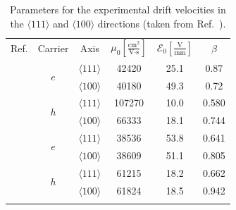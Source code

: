 \documentclass[epj,referee]{svjour}
\begin{document}
\begin{table}[htpb]
\centering
\caption{Parameters for the experimental drift velocities in the
$\langle111\rangle$ and $\langle 100 \rangle$ directions
(taken from Ref.~\cite{bart}).}
\label{t:pars}
\begin{tabular}{cccccc}
\hline\noalign{\smallskip}
Ref. & Carrier & Axis &
$\mu_{0} \left[\frac{\mbox{cm}^{2}}{\mbox{V}\cdot\mbox{s}}\right]$ &
$\mathcal{E}_{0}\left[\frac{\mbox{V}}{\mbox{mm}}\right]$ & $\beta$\\
\noalign{\smallskip}\hline\noalign{\smallskip}

\multirow{2}{*}{\cite{miha}}&\multirow{2}{*}{$e$} &
$\langle111\rangle$ & 42420 & 25.1 & 0.87 \\
& & $\langle100\rangle$ & 40180 & 49.3 & 0.72 \\
\noalign{\smallskip}\hline\noalign{\smallskip}

\multirow{2}{*}{\cite{reg}}&\multirow{2}{*}{$h$} &
$\langle111\rangle$ & 107270 & 10.0 & 0.580 \\
& & $\langle100\rangle$ & 66333 & 18.1 & 0.744 \\
\noalign{\smallskip}\hline\noalign{\smallskip}

\multirow{4}{*}{\cite{bart}}&\multirow{2}{*}{$e$} &
$\langle111\rangle$ & 38536 & 53.8 & 0.641 \\
& & $\langle100\rangle$ & 38609 & 51.1 & 0.805 \\
\noalign{\smallskip}\cline{2-6}\noalign{\smallskip}

&\multirow{2}{*}{$h$} & $\langle111\rangle$ & 61215 & 18.2 & 0.662 \\ 
& & $\langle100\rangle$ & 61824 & 18.5 & 0.942 \\
\noalign{\smallskip}\hline\noalign{\smallskip}
\end{tabular} 
\end{table}
 
\end{document}
